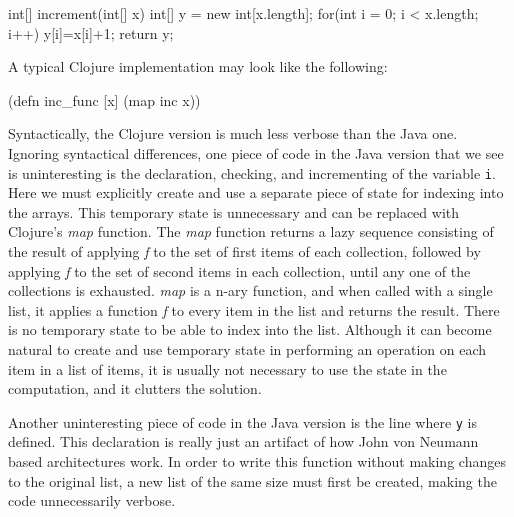 int[] increment(int[] x) {
	int[] y = new int[x.length];
	for(int i = 0; i < x.length; i++) { 
	  y[i]=x[i]+1;
         }
         return y;
}

A typical Clojure implementation may look like the following: 

(defn inc_func [x] (map inc x))

Syntactically, the Clojure version is much less verbose than the Java one.
Ignoring syntactical differences, one piece of code in the Java version that we see is uninteresting is the declaration,
checking, and incrementing of the variable {\tt i}. 
Here we must explicitly create and use a separate piece of state for indexing into the arrays. 
This temporary state is unnecessary and can be replaced with Clojure's
{\it map} function. The {\it map} function returns a lazy sequence
consisting of the result of applying {\it f} to the
set of first items of each collection, followed by applying {\it f} to the set
of second items in each collection, until any one of the collections is
exhausted. {\it map} is a n-ary function, and when called with a
single list, it applies a function {\it f} to every item in the list
and returns the result. 
There is no temporary state to be able to index into the list. 
Although it can become natural to create and use temporary state in performing an operation on each item in a list of items,
it is usually not necessary to use the state in the computation, and it clutters the solution. 

Another uninteresting piece of code in the Java version is the line
where {\tt y} is defined. 
This declaration is really just an artifact of how John von Neumann based architectures work. In order to write this function without making changes to 
the original list, a new list of the same size must first be created, making the code unnecessarily verbose. 

